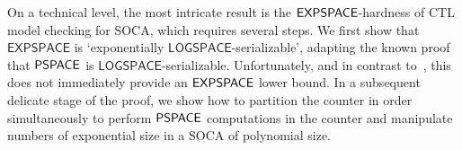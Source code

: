 
On a technical level, the most intricate result is the
${\mathsf{EXPSPACE}}$-hardness of CTL model checking for SOCA, which requires
several steps. We first show that $\mathsf{EXPSPACE}$ is `exponentially
$\mathsf{LOGSPACE}$-serializable', adapting the known proof that
${\mathsf{PSPACE}}$ is $\mathsf{LOGSPACE}$-serializable. Unfortunately, and in
contrast to~\cite{GoLo10}, this does not immediately provide
an ${\mathsf{EXPSPACE}}$ lower bound. In a subsequent delicate stage of the
proof, we show how to partition the counter in order simultaneously to
perform ${\mathsf{PSPACE}}$ computations in the counter and manipulate numbers
of exponential size in a SOCA of polynomial size.

